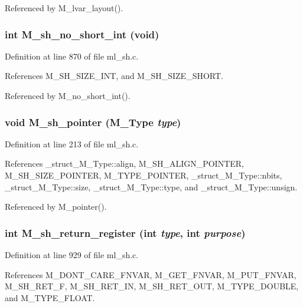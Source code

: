 Referenced by M\_\-lvar\_\-layout().
\subsubsection{\setlength{\rightskip}{0pt plus 5cm}int M\_\-sh\_\-no\_\-short\_\-int (void)}\label{ml__sh_8c_f811ced2c8723497d2a089fd4bf24e0d}




Definition at line 870 of file ml\_\-sh.c.

References M\_\-SH\_\-SIZE\_\-INT, and M\_\-SH\_\-SIZE\_\-SHORT.

Referenced by M\_\-no\_\-short\_\-int().
\subsubsection{\setlength{\rightskip}{0pt plus 5cm}void M\_\-sh\_\-pointer (\bf{M\_\-Type} {\em type})}\label{ml__sh_8c_f379a676b1a2d9b6acb4e3ab2280d743}




Definition at line 213 of file ml\_\-sh.c.

References \_\-struct\_\-M\_\-Type::align, M\_\-SH\_\-ALIGN\_\-POINTER, M\_\-SH\_\-SIZE\_\-POINTER, M\_\-TYPE\_\-POINTER, \_\-struct\_\-M\_\-Type::nbits, \_\-struct\_\-M\_\-Type::size, \_\-struct\_\-M\_\-Type::type, and \_\-struct\_\-M\_\-Type::unsign.

Referenced by M\_\-pointer().
\subsubsection{\setlength{\rightskip}{0pt plus 5cm}int M\_\-sh\_\-return\_\-register (int {\em type}, int {\em purpose})}\label{ml__sh_8c_e7f7b08c2a13de2ec22822c1ea1c2bf0}




Definition at line 929 of file ml\_\-sh.c.

References M\_\-DONT\_\-CARE\_\-FNVAR, M\_\-GET\_\-FNVAR, M\_\-PUT\_\-FNVAR, M\_\-SH\_\-RET\_\-F, M\_\-SH\_\-RET\_\-IN, M\_\-SH\_\-RET\_\-OUT, M\_\-TYPE\_\-DOUBLE, and M\_\-TYPE\_\-FLOAT.

